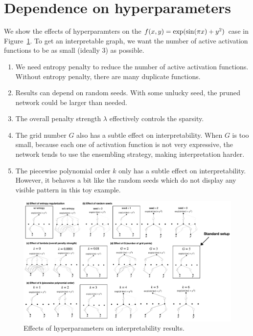 \documentclass{article}
\numberwithin{equation}{section}
\numberwithin{figure}{section}
\begin{document}
\section{Dependence on hyperparameters}\label{app:interp_hyperparams}

We show the effects of hyperparamters on the $f(x,y)={\rm exp}({\rm sin}(\pi x)+y^2)$ case in Figure~\ref{fig:interp_hyperparams}. To get an interpretable graph, we want the number of active activation functions to be as small (ideally 3) as possible. 
\begin{enumerate}[(1)]
    \item We need entropy penalty to reduce the number of active activation functions. Without entropy penalty, there are many duplicate functions.
    \item Results can depend on random seeds. With some unlucky seed, the pruned network could be larger than needed.
    \item The overall penalty strength $\lambda$ effectively controls the sparsity.
    \item  The grid number $G$ also has a subtle effect on interpretability. When $G$ is too small, because each one of activation function is not very expressive, the network tends to use the ensembling strategy, making interpretation harder.
    \item The piecewise polynomial order $k$ only has a subtle effect on interpretability. However, it behaves a bit like the random seeds which do not display any visible pattern in this toy example. 
\end{enumerate}


\begin{figure}[t]
    \centering
    \includegraphics[width=1\linewidth]{figs/interpretability_hyperparameters.png}
    \caption{Effects of hyperparameters on interpretability results.}
    \label{fig:interp_hyperparams}
\end{figure}
\end{document}
